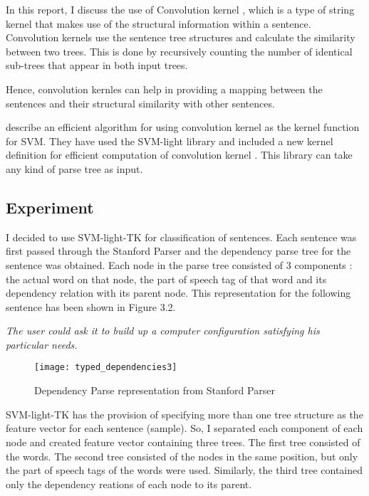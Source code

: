 In this report, I discuss the use of Convolution kernel \citep{Collins and Duffy []}, which is a type of string kernel that makes use of the structural information within a sentence.
Convolution kernels use the sentence tree structures and calculate the similarity between two trees.
This is done by recursively counting the number of identical sub-trees that appear in both input trees.


Hence, convolution kernles can help in providing a mapping between the sentences and their structural similarity with other sentences.

\citep{Moschitti et. al.[]} describe an efficient algorithm for using convolution kernel as the kernel function for SVM.
They have used the SVM-light library and included a new kernel definition for efficient computation of convolution kernel \citep{SVM-light-TK []}.
This library can take any kind of parse tree as input.

\subsection{Experiment}
I decided to use SVM-light-TK for classification of sentences.
Each sentence was first passed through the Stanford Parser and the dependency parse tree for the sentence was obtained.
Each node in the parse tree consisted of 3 components : the actual word on that node, the part of speech tag of that word and its dependency relation with its parent node.
This representation for the following sentence has been shown in Figure 3.2.

\emph{The user could ask it to build up a computer configuration satisfying his particular needs.}

\begin{figure}[h]
\centering
\texttt{[image: typed\_dependencies3]} 
\caption{Dependency Parse representation from Stanford Parser}
\label{fig:dep-parse}
\end{figure}

SVM-light-TK has the provision of specifying more than one tree structure as the feature vector for each sentence (sample).
So, I separated each component of each node and created feature vector containing three trees.
The first tree consisted of the words.
The second tree consisted of the nodes in the same position, but only the part of speech tags of the words were used.
Similarly, the third tree contained only the dependency reations of each node to its parent.

